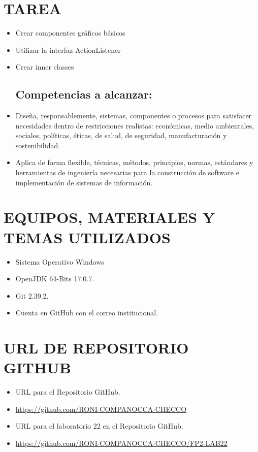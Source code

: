 \documentclass{article}
\begin{document}
    \section{TAREA}
	\begin{itemize}	
    \subsection{Objetivos:}
		\item Crear componentes gráficos básicos
		\item Utilizar la interfaz ActionListener 
        \item Crear inner classes 
       
    \subsection{Competencias a alcanzar:}
		\item Diseña, responsablemente, sistemas, componentes o procesos para satisfacer necesidades dentro de restricciones realistas: económicas, medio ambientales, sociales, políticas, éticas, de salud, de seguridad, manufacturación y sostenibilidad. 
        \item Aplica de forma flexible, técnicas, métodos, principios, normas, estándares y herramientas de ingeniería necesarias para la construcción de software e implementación de sistemas de información.
    \end{itemize}

    \section{EQUIPOS, MATERIALES Y TEMAS UTILIZADOS}
	\begin{itemize}
		\item Sistema Operativo Windows
		\item OpenJDK 64-Bits 17.0.7.
		\item Git 2.39.2.	
  	\item Cuenta en GitHub con el correo institucional.
	\end{itemize}

    \section{URL DE REPOSITORIO GITHUB}
	\begin{itemize}
		\item URL para el Repositorio GitHub.
		\item \url{https://github.com/RONI-COMPANOCCA-CHECCO}
		\item URL para el laboratorio 22 en el Repositorio GitHub.	
        \item \url{https://github.com/RONI-COMPANOCCA-CHECCO/FP2-LAB22}
	\end{itemize}
    
\end{document}
